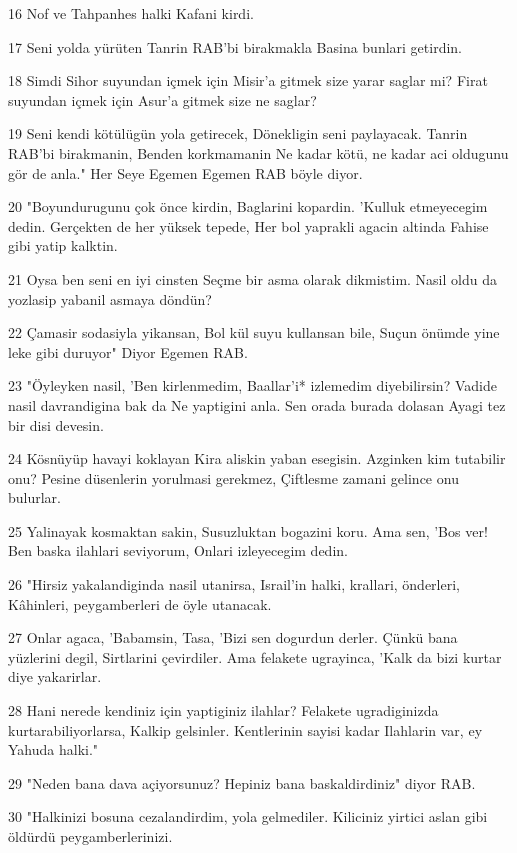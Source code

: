 \par 16 Nof ve Tahpanhes halki Kafani kirdi.
\par 17 Seni yolda yürüten Tanrin RAB'bi birakmakla Basina bunlari getirdin.
\par 18 Simdi Sihor suyundan içmek için Misir'a gitmek size yarar saglar mi? Firat suyundan içmek için Asur'a gitmek size ne saglar?
\par 19 Seni kendi kötülügün yola getirecek, Dönekligin seni paylayacak. Tanrin RAB'bi birakmanin, Benden korkmamanin Ne kadar kötü, ne kadar aci oldugunu gör de anla." Her Seye Egemen Egemen RAB böyle diyor.
\par 20 "Boyundurugunu çok önce kirdin, Baglarini kopardin. 'Kulluk etmeyecegim dedin. Gerçekten de her yüksek tepede, Her bol yaprakli agacin altinda Fahise gibi yatip kalktin.
\par 21 Oysa ben seni en iyi cinsten Seçme bir asma olarak dikmistim. Nasil oldu da yozlasip yabanil asmaya döndün?
\par 22 Çamasir sodasiyla yikansan, Bol kül suyu kullansan bile, Suçun önümde yine leke gibi duruyor" Diyor Egemen RAB.
\par 23 "Öyleyken nasil, 'Ben kirlenmedim, Baallar'i* izlemedim diyebilirsin? Vadide nasil davrandigina bak da Ne yaptigini anla. Sen orada burada dolasan Ayagi tez bir disi devesin.
\par 24 Kösnüyüp havayi koklayan Kira aliskin yaban esegisin. Azginken kim tutabilir onu? Pesine düsenlerin yorulmasi gerekmez, Çiftlesme zamani gelince onu bulurlar.
\par 25 Yalinayak kosmaktan sakin, Susuzluktan bogazini koru. Ama sen, 'Bos ver! Ben baska ilahlari seviyorum, Onlari izleyecegim dedin.
\par 26 "Hirsiz yakalandiginda nasil utanirsa, Israil'in halki, krallari, önderleri, Kâhinleri, peygamberleri de öyle utanacak.
\par 27 Onlar agaca, 'Babamsin, Tasa, 'Bizi sen dogurdun derler. Çünkü bana yüzlerini degil, Sirtlarini çevirdiler. Ama felakete ugrayinca, 'Kalk da bizi kurtar diye yakarirlar.
\par 28 Hani nerede kendiniz için yaptiginiz ilahlar? Felakete ugradiginizda kurtarabiliyorlarsa, Kalkip gelsinler. Kentlerinin sayisi kadar Ilahlarin var, ey Yahuda halki."
\par 29 "Neden bana dava açiyorsunuz? Hepiniz bana baskaldirdiniz" diyor RAB.
\par 30 "Halkinizi bosuna cezalandirdim, yola gelmediler. Kiliciniz yirtici aslan gibi öldürdü peygamberlerinizi.
